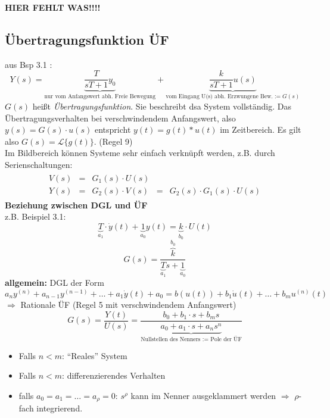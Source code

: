 \message{ !name(Mitschrieb_SysRegel.tex)}\documentclass[12pt,a4paper,ngerman]{scrartcl}
\begin{document}
\textbf{HIER FEHLT WAS!!!!}

\subsection{Übertragungsfunktion ÜF}

aus Bsp 3.1 :
\begin{equation*}
  Y(s)= \underbrace{\frac{T}{sT+1}y_0}_{\text{nur vom Anfangswert abh. Freie Bewegung}} + \underbrace{\frac{k}{sT+1}u(s)}_{\text{vom Eingang U(s) abh. Erzwungene Bew.}:=G(s)}
\end{equation*}
$G(s)$ heißt \emph{Übertragungsfunktion}. Sie beschreibt dsa System vollständig. Das Übertragungsverhalten bei verschwindendem Anfangswert, also $y(s)=G(s)\cdot u(s)$ entspricht $y(t)=g(t)*u(t)$ im Zeitbereich. Es gilt also $G(s)=\mathcal{L}\{g(t)\}$. (Regel 9)\\
Im Bildbereich können Systeme sehr einfach verknüpft werden, z.B. durch Serienschaltungen:
\begin{align*}
  \begin{array}{lllll}
    V(s)&=&G_1(s)\cdot U(s)\\
    Y(s)&=&G_2(s)\cdot V(s)&=&G_2(s)\cdot G_1(s)\cdot U(s)
  \end{array}
\end{align*}
\textbf{Beziehung zwischen DGL und ÜF}\\
z.B. Beispiel 3.1:
\begin{equation*}
  \underbrace{T}_{a_1}\cdot \dot{y}(t) +\underbrace{1}_{a_0}y(t)=\underbrace{k}_{b_0}\cdot U(t)
\end{equation*}
\begin{equation*}
  G(s)=\frac{\overbrace{k}^{b_0}}{\underbrace{T}_{a_1}s+\underbrace{1}_{a_0}}
\end{equation*}
\textbf{allgemein:} DGL der Form\\
\begin{equation*}
  a_ny^{(n)}+a_{n-1}y^{(n-1)}+\dots +a_1\dot{y}(t)+a_0=b(u(t))+b_1\dot{u}(t)+\dots +b_mu^{(n)}(t)
\end{equation*}
$\Rightarrow$ Rationale ÜF (Regel 5 mit verschwindendem Anfangswert)
\begin{equation*}
  G(s)=\frac{Y(t)}{U(s)}= \frac{b_0+b_1\cdot s + b_ms}{\underbrace{a_0+a_1\cdot s +a_ns^n}_{\text{Nullstellen des Nenners }:=\text{ Pole der ÜF}}}
\end{equation*}
\begin{itemize}
\item Falls $n<m$: ``Reales'' System
\item Falls $n<m$: differenzierendes Verhalten
\item falls $a_0=a_1=\dots=a_\rho =0$: $s^\rho$ kann im Nenner ausgeklammert werden $\Rightarrow$ $\rho$-fach integrierend. 
\end{itemize}
\end{document}
